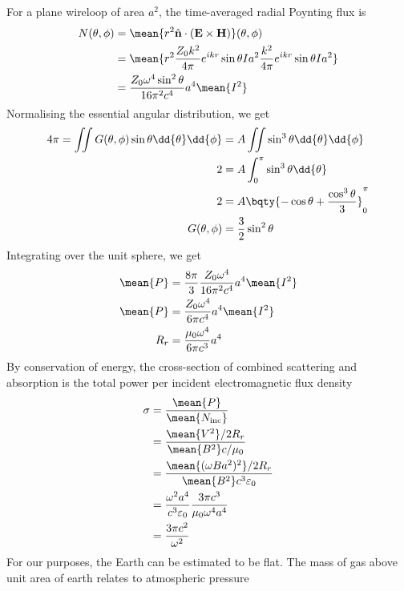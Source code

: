 \documentclass[12pt]{extarticle}
\begin{document}
\begin{outline}
        For a plane wireloop of area \(a^2\), the time-averaged radial Poynting flux is \begin{align*}
            N(\theta,\phi) &= \mean{r^2 \hat{\bf n} \cdot (\bf E \times \bf H)}(\theta,\phi)\\
            &= \mean{r^2 \frac{Z_0k^2}{4\pi}e^{ikr} \sin\theta Ia^2\frac{k^2}{4\pi}e^{ikr} \sin\theta Ia^2}\\
            &= {\frac{Z_0 \omega^4 \sin^2\theta }{16\pi^2 c^4 } } a^4 \mean{I^2} 
        \end{align*}
        Normalising the essential angular distribution, we get \begin{align*}
            4\pi =\iint G(\theta,\phi) \sin\theta\dd{\theta} \dd{\phi} &= A \iint \sin^3\theta \dd{\theta} \dd{\phi}\\
            2 &=  A \int_0^\pi \sin^3\theta \dd{\theta}\\
            2 &=  A {\bqty{ -\cos\theta + \frac{\cos^3\theta}{3}}_0^\pi}\\
            G(\theta,\phi) &= \frac{3}{2} \sin^2\theta
        \end{align*}
        Integrating over the unit sphere, we get
        \begin{align*}
            \mean{P} &= \frac{8\pi}{3}{\frac{Z_0 \omega^4  }{16\pi^2 c^4 } } a^4 \mean{I^2} \\
            \mean{P} &= {\frac{Z_0 \omega^4  }{6\pi c^4 } } a^4 \mean{I^2} \\
            R_r &= {\frac{\mu_0 \omega^4  }{6\pi c^3 } } a^4 
        \end{align*}
        By conservation of energy, the cross-section of combined scattering and absorption is the total power per incident electromagnetic flux density
        \begin{align*}
            \sigma &= \frac{\mean{P}}{\mean{N_{\text{inc}}}} \\
            &= \frac{\mean{V^2}  /2R_r}{\mean{B^2}  c/\mu_0} \\
            &= \frac{\mean{(\omega B a^2)^2}  /2R_r}{\mean{B^2}  c^3 \varepsilon_0} \\
            &= \frac{\omega^2 a^4}{c^3\varepsilon_0} \frac{3\pi c^3 }{\mu_0\omega^4 a^4}\\
            &= \frac{3\pi c^2}{\omega^2}
        \end{align*}
        \1 For our purposes, the Earth can be estimated to be flat. The mass of gas above unit area of earth relates to atmospheric pressure \begin{align*}

\end{align*}
\end{outline}
\end{document}
